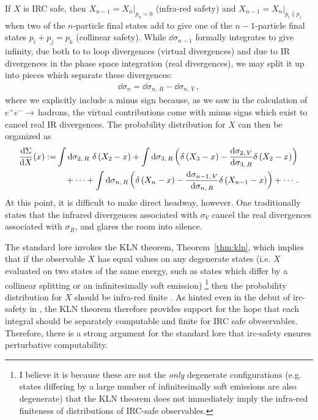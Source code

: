 If \(X\) is IRC safe, then \(X_{n-1} = X_n \big|_{p_n = 0}\) (infra-red safety) and \(X_{n-1} = X_n \big|_{p_i \parallel p_j}\) when two of the \(n\)-particle final states add to give one of the \(n-1\)-particle final states \(p_i + p_j = p_k\) (collinear safety).
%
While \(\dd\sigma_{n-1}\) formally integrates to give infinity, due both to to loop divergences (virtual divergences) and due to IR divergences in the phase space integration (real divergences), we may split it up into pieces which separate these divergences:
\begin{align}
    \dd \sigma_{n} = \dd \sigma_{n,\,R} - \dd \sigma_{n,\,V}
    \,,
\end{align}
where we explicitly include a minus sign because, as we saw in the calculation of \(e^+ e^-\to\,\)hadrons, the virtual contributions come with minus signs which exist to cancel real IR divergences.
%
The probability distribution for \(X\) can then be organized as
\begin{equation}
\begin{aligned}
    \label{eq:prob_distribution}
    \frac{\dd\Sigma}{\dd X}(x)
    :=
    &
    \int \dd\sigma_{2,\,R} \,\,\delta\le(X_2 - x\ri)
    +
    \int \dd\sigma_{3,\,R} \le(
        \delta\le(X_3 - x\ri)
        -
        \frac{\dd \sigma_{2,\,V}}{\dd\sigma_{3,\,R}}
        \delta\le(X_2 - x\ri)
    \ri)
    \\
    &
    \quad
    +
    \cdots
    +
    \int \dd\sigma_{n,\,R} \le(
        \delta\le(X_n - x\ri)
        -
        \frac{\dd \sigma_{n-1,\,V}}{\dd\sigma_{n,\,R}}
        \delta\le(X_{n-1} - x\ri)
    \ri)
    +
    \cdots
    \,.
\end{aligned}
\end{equation}
%
At this point, it is difficult to make direct headway, however.
%
One traditionally states that the infrared divergences associated with \(\sigma_V\) cancel the real divergences associated with \(\sigma_R\), and glares the room into silence.


The standard lore invokes the KLN theorem, Theorem~\ref{thm:kln}, which implies that if the observable \(X\) has equal values on any degenerate states (i.e. \(X\) evaluated on two states of the same energy, such as states which differ by a collinear splitting or an infinitesimally soft emission)%
\footnote{
    I believe it is because these are not the \textit{only} degenerate configurations (e.g. states differing by a large number of infinitesimally soft emissions are also degenerate) that the KLN theorem does not immediately imply the infra-red finiteness of distributions of IRC-safe observables.
}%
then the probability distribution for \(X\) should be infra-red finite \cite{Kinoshita:1962ur,Lee:1964is}.
%
As hinted even in the debut of \gls{irc-safety} in , the KLN theorem therefore provides support for the hope that each integral should be separately computable and finite for IRC safe obvservables.
%
Therefore, there is a strong argument for the standard lore that \gls{irc-safety} ensures perturbative computability.



